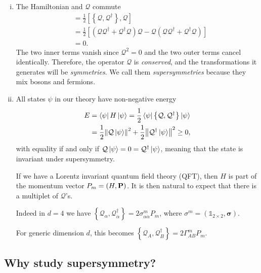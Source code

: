 \begin{enumerate}[i)]
  \item The Hamiltonian and $\mathcal{Q}$ commute
    \begin{align}
      [H, \mathcal{Q}] &= \frac{1}{2} [\left\{ \mathcal{Q}, \mathcal{Q}^{\dagger} \right\}, \mathcal{Q}]  \\
	     &= \frac{1}{2} [(\mathcal{Q} \mathcal{Q}^{\dagger} + \mathcal{Q}^{\dagger} \mathcal{Q}) \mathcal{Q} - \mathcal{Q} (\mathcal{Q} \mathcal{Q}^{\dagger} + \mathcal{Q}^{\dagger} \mathcal{Q})] \\
	     &= 0.
    \end{align}
    The two inner terms vanish since $\mathcal{Q}^2 = 0$ and the two outer terms cancel identically.
    Therefore, the operator $\mathcal{Q}$ is \emph{conserved}, and the transformations it generates will be \emph{symmetries}. We call them \emph{supersymmetries} because they mix bosons and fermions.
  \item All states $\psi$ in our theory have non-negative energy
    \begin{align}
      E &= \bra{\psi} H \ket{\psi} = \frac{1}{2} \bra{\psi} \left\{ \mathcal{Q}, \mathcal{Q}^{\dagger} \right\} \ket{\psi} \\
      &= \frac{1}{2} \norm{\mathcal{Q} \ket{\psi}}^2 + \frac{1}{2} \norm{\mathcal{Q}^{\dagger} \ket{\psi}}^2 \geq 0,
    \end{align}
    with equality if and only if $\mathcal{Q} \ket{\psi} = 0 = \mathcal{Q}^{\dagger} \ket{\psi}$, meaning that the state is invariant under supersymmetry.

    If we have a Lorentz invariant quantum field theory (QFT), then $H$ is part of the momentum vector $P_m = (H, \vb{P})$. It is then natural to expect that there is a multiplet of $\mathcal{Q}$'s.\par
    Indeed in $d = 4$ we have $\left\{ \mathcal{Q}_{\alpha}, \mathcal{Q}^{\dagger}_{\dot\alpha} \right\} = 2 \sigma^{m}_{\alpha \dot{\alpha}} P_m$, where $\sigma^{m} = (\mathbb{1}_{2 \times 2}, \boldsymbol\sigma)$.\par
    For generic dimension $d$, this becomes $\left\{ \mathcal{Q}_A, \mathcal{Q}_B^{\dagger} \right\} = 2 \Gamma^{m}_{AB} P_{m}$.
\end{enumerate}

\subsection*{Why study supersymmetry?}%

